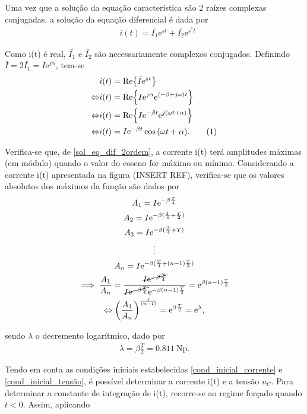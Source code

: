 \documentclass[a4paper, titlepage, portuguese]{article}
\newcommand{\eq}{\Leftrightarrow} %
\newcommand\numberthis{\addtocounter{equation}{1}\tag{\theequation}}
\newcommand\e{\mathrm{e} }
\begin{document}
		Uma vez que a solução da equação característica são 2 raízes complexas conjugadas, a solução da equação diferencial é dada por
		\begin{align*}
			&i(t) = \bar{I_1}\e^{st} + \bar{I_2}\e^{s^{*}t}
		\end{align*}

		Como i(t) é real, $\bar{I_{1}}$ e $\bar{I_{2}}$ são necessariamente complexos conjugados. Definindo $\bar{I} = 2\bar{I_1} = I\e^{j\alpha}$, tem-se
		\begin{align*}
			& i(t) = \Re{\bar{I}\e^{st}} \\ \eq
			& i(t) = \Re{I\e^{j\alpha}\e^{(-\beta + j\omega)t}} \\ \eq
			& i(t) = \Re{I\e^{-\beta t}\e^{j(\omega t + \alpha)}} \\ \eq
			& i(t) = I\e^{-\beta t} \cos{(\omega t + \alpha)}. \numberthis \label{sol_eq_dif_2ordem}
		\end{align*}

		Verifica-se que, de \ref{sol_eq_dif_2ordem}, a corrente i(t) terá amplitudes máximas (em módulo) quando o valor do coseno for máximo ou mínimo. Considerando a corrente i(t) apresentada na figura (INSERT REF), verifica-se que os valores absolutos dos máximos da função são dados por
		\begin{gather*}
			 A_1 = I\e^{-\beta \frac{T}{4}} \\
			 A_2 = I\e^{-\beta(\frac{T}{4} + \frac{T}{2})} \\
			 A_3 = I\e^{-\beta(\frac{T}{4} + T)}\\
			\vdots \\
			 A_n = I\e^{-\beta(\frac{T}{4} + (n-1)\frac{T}{2})} \\
			 \implies \frac{A_1}{A_n} = \frac{\cancel{I\e^{-\beta \frac{T}{4}}}}{\cancel{I\e^{-\beta\frac{T}{4}}} \e^{-\beta(n-1)\frac{T}{2}}} = \e^{\beta(n-1)\frac{T}{2}} \\ \eq
			 \left(\frac{A_1}{A_n}\right)^{\frac{1}{(n-1)}} = \e^{\beta\frac{T}{2}} = \e^\lambda,
		\end{gather*}

		sendo $\lambda$ o decremento logarítmico, dado por
		\begin{align*}
			 \lambda = \beta \frac{T}{2} = \SI{0.811}{\neper}.
		\end{align*}

		Tendo em conta as condições iniciais estabelecidas \ref{cond_inicial_corrente} e \ref{cond_inicial_tensão}, é possível determinar a corrente i(t) e a tensão $u_{C}$. Para determinar a constante de integração de i(t), recorre-se ao regime forçado quando $t < 0$. Assim, aplicando

	\subsubsection{}



\end{document}
